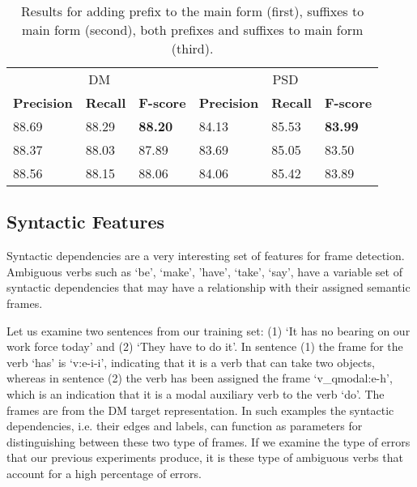 \begin{table}
    \centering
    \smaller[0.2]
    \begin{tabular}{@{}llllll@{}}
        \toprule
        \multicolumn{3}{c}{DM}
        & \multicolumn{3}{c}{PSD} \\
        \textbf{Precision} & \textbf{Recall} & \textbf{F-score} & \textbf{Precision} & \textbf{Recall} & \textbf{F-score} \\
        \midrule
        88.69 & 88.29 & \textbf{88.20} & 84.13 & 85.53 & \textbf{83.99} \\
        88.37 & 88.03 & 87.89 & 83.69 & 85.05 & 83.50 \\
        88.56 & 88.15 & 88.06 & 84.06 & 85.42 & 83.89 \\
        \bottomrule
    \end{tabular}
    \caption{Results for adding prefix to the main form (first), suffixes to main form (second), both prefixes and suffixes to main form (third).}
    \label{table:affix_suffix}
\end{table}






\subsection{Syntactic Features}
\label{results_syn}



Syntactic dependencies are a very interesting set of features for frame detection. Ambiguous verbs such as `be', `make', 'have', `take', `say', have a variable set of syntactic dependencies that may have a relationship with their assigned semantic frames.

Let us examine two sentences from our training set: (1) `It has no bearing on our work force today' and (2) `They have to do it'. In sentence (1) the frame for the verb `has' is `v:e-i-i', indicating that it is a verb that can take two objects, whereas in sentence (2) the verb has been assigned the frame `v\_qmodal:e-h', which is an indication that it is a modal auxiliary verb to the verb `do'. The frames are from the DM target representation. In such examples the syntactic dependencies, i.e. their edges and labels, can function as parameters for distinguishing between these two type of frames. If we examine the type of errors that our previous experiments produce, it is these type of ambiguous verbs that account for a high percentage of errors.

